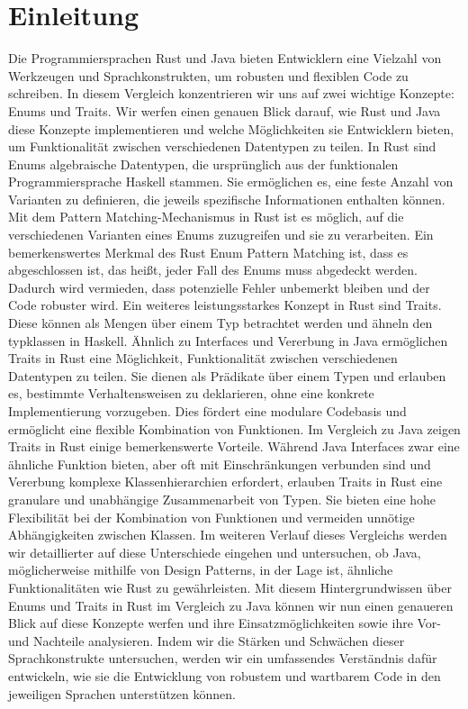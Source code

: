 \documentclass[a4paper, 1ppt]{article}
\begin{document}
\section{Einleitung}
Die Programmiersprachen Rust und Java bieten Entwicklern eine Vielzahl von Werkzeugen und Sprachkonstrukten, um robusten und flexiblen Code zu schreiben. In diesem Vergleich konzentrieren wir uns auf zwei wichtige Konzepte: Enums und Traits. Wir werfen einen genauen Blick darauf, wie Rust und Java diese Konzepte implementieren und welche Möglichkeiten sie Entwicklern bieten, um Funktionalität zwischen verschiedenen Datentypen zu teilen.
In Rust sind Enums algebraische Datentypen, die ursprünglich aus der funktionalen Programmiersprache Haskell stammen. Sie ermöglichen es, eine feste Anzahl von Varianten zu definieren, die jeweils spezifische Informationen enthalten können. Mit dem Pattern Matching-Mechanismus in Rust ist es möglich, auf die verschiedenen Varianten eines Enums zuzugreifen und sie zu verarbeiten. Ein bemerkenswertes Merkmal des Rust Enum Pattern Matching ist, dass es abgeschlossen ist, das heißt, jeder Fall des Enums muss abgedeckt werden. Dadurch wird vermieden, dass potenzielle Fehler unbemerkt bleiben und der Code robuster wird.
Ein weiteres leistungsstarkes Konzept in Rust sind Traits. Diese können als Mengen über einem Typ betrachtet werden und ähneln den typklassen in Haskell. Ähnlich zu Interfaces und Vererbung in Java ermöglichen Traits in Rust eine Möglichkeit, Funktionalität zwischen verschiedenen Datentypen zu teilen. Sie dienen als Prädikate über einem Typen und erlauben es, bestimmte Verhaltensweisen zu deklarieren, ohne eine konkrete Implementierung vorzugeben. Dies fördert eine modulare Codebasis und ermöglicht eine flexible Kombination von Funktionen.
Im Vergleich zu Java zeigen Traits in Rust einige bemerkenswerte Vorteile. Während Java Interfaces zwar eine ähnliche Funktion bieten, aber oft mit Einschränkungen verbunden sind und Vererbung komplexe Klassenhierarchien erfordert, erlauben Traits in Rust eine granulare und unabhängige Zusammenarbeit von Typen. Sie bieten eine hohe Flexibilität bei der Kombination von Funktionen und vermeiden unnötige Abhängigkeiten zwischen Klassen. Im weiteren Verlauf dieses Vergleichs werden wir detaillierter auf diese Unterschiede eingehen und untersuchen, ob Java, möglicherweise mithilfe von Design Patterns, in der Lage ist, ähnliche Funktionalitäten wie Rust zu gewährleisten.
Mit diesem Hintergrundwissen über Enums und Traits in Rust im Vergleich zu Java können wir nun einen genaueren Blick auf diese Konzepte werfen und ihre Einsatzmöglichkeiten sowie ihre Vor- und Nachteile analysieren. Indem wir die Stärken und Schwächen dieser Sprachkonstrukte untersuchen, werden wir ein umfassendes Verständnis dafür entwickeln, wie sie die Entwicklung von robustem und wartbarem Code in den jeweiligen Sprachen unterstützen können.
\newpage
\end{document}
